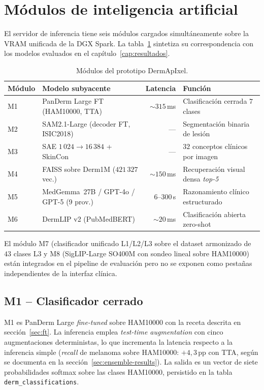 \section{Módulos de inteligencia artificial}
\label{sec:dermapixel-modulos}

El servidor de inferencia tiene seis módulos cargados
simultáneamente sobre la VRAM unificada de la DGX Spark. La
tabla~\ref{tab:dermapixel-modulos} sintetiza su correspondencia
con los modelos evaluados en el capítulo~\ref{cap:resultados}.

\begin{table}[H]
\centering
\footnotesize
\setlength{\tabcolsep}{3pt}
\renewcommand{\arraystretch}{0.95}
\caption{Módulos del prototipo DermApIxel.}
\label{tab:dermapixel-modulos}
\begin{tabular}{llrl}
\hline
Módulo & Modelo subyacente                       & Latencia & Función \\
\hline
M1     & PanDerm Large FT (HAM10000, TTA)         & $\sim 315$\,ms & Clasificación cerrada $7$ clases \\
M2     & SAM2.1-Large (decoder FT, ISIC2018)      & ---            & Segmentación binaria de lesión \\
M3     & SAE $1\,024 \to 16\,384$ + SkinCon       & ---            & $32$ conceptos clínicos por imagen \\
M4     & FAISS sobre Derm1M ($421\,327$ vec.)     & $\sim 150$\,ms & Recuperación visual densa \emph{top-5} \\
M5     & MedGemma~27B / GPT-4o / GPT-5 (9 prov.)  & $6$--$300$\,s  & Razonamiento clínico estructurado \\
M6     & DermLIP v2 (PubMedBERT)                  & $\sim 20$\,ms  & Clasificación abierta zero-shot \\
\hline
\end{tabular}
\end{table}

El módulo M7 (clasificador unificado L1/L2/L3 sobre el dataset
armonizado de $43$ clases L3 y M8 (SigLIP-Large SO400M
con sondeo lineal sobre HAM10000) están integrados en el pipeline
de evaluación pero no se exponen como pestañas independientes de
la interfaz clínica.

\subsection{M1 -- Clasificador cerrado}
\label{sec:dermapixel-m1}

M1 es PanDerm Large \emph{fine-tuned} sobre HAM10000 con la receta
descrita en sección~\ref{sec:ft}. La inferencia emplea \emph{test-time
augmentation} con cinco augmentaciones deterministas, lo que
incrementa la latencia respecto a la inferencia simple
(\emph{recall} de melanoma sobre HAM10000:
$+4{,}3$\,pp con TTA, según se documenta en la
sección~\ref{sec:ensemble-results}). La salida es un vector de siete
probabilidades softmax sobre las clases HAM10000, persistido en la
tabla \texttt{derm\_classifications}.

